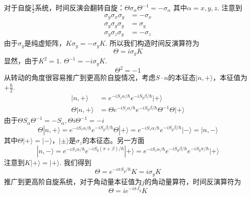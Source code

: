 \documentclass{article}
\numberwithin{equation}{subsection}
\begin{document}
对于自旋$\frac{1}{2}$系统，时间反演会翻转自旋：$\Theta\sigma_\alpha\Theta^{-1}=-\sigma_\alpha$
其中$\alpha=x,y,z$. 注意到
\begin{equation}
    \begin{split}
        \sigma_y\sigma_x\sigma_y&=-\sigma_x\\
        \sigma_y\sigma_y\sigma_y&=\sigma_y\\
        \sigma_y\sigma_z\sigma_y&=-\sigma_z
    \end{split}
\end{equation}
由于$\sigma_y$是纯虚矩阵，$K\sigma_y=-\sigma_yK$. 所以我们构造时间反演算符为
\begin{equation}
    \Theta=i\sigma_yK
\end{equation}
显然，由于$K^2=1$. $\Theta^{-1}=-i\sigma_yK$. 
\begin{equation}
    \Theta^2=-1
\end{equation}
从转动的角度很容易推广到更高阶自旋情况，考虑$S\cdot n$的本征态$|n,+\rangle$，本征值为$+\frac{\hbar}{2}$.
\begin{equation}
    \begin{aligned}
        |n,+\rangle &=e^{-i S_{z} \alpha / \hbar} e^{-i S_{y} \beta / \hbar}|+\rangle \\
        \Theta|n,+\rangle &=\Theta e^{-i S_{z} \alpha / \hbar} e^{-i S_{y} \beta / \hbar} \Theta^{-1} \Theta|+\rangle
        \end{aligned}
\end{equation}
由于$\Theta S_\alpha\Theta^{-1}=-S_\alpha,\Theta i\Theta^{-1}=-i$
\begin{equation}
    \Theta|n,+\rangle=e^{-i S_{z} \alpha / \hbar} e^{-i S_{y} \beta / \hbar} \Theta|+\rangle=e^{-i S_{z} \alpha / \hbar} e^{-i S_{y} \beta / \hbar}|-\rangle=|n,-\rangle
\end{equation}
其中$\Theta|+\rangle=|-\rangle$，$|\pm\rangle$是$\sigma_z$的本征态。另一方面
\begin{equation}
    |n,-\rangle=e^{-i S_{z} \alpha / \hbar} e^{-i S_{y}(\pi+\beta) / \hbar}|+\rangle=e^{-i S_{z} \alpha / \hbar} e^{-i S_{y} \beta / \hbar} e^{-i S_{y} \pi / \hbar}|+\rangle
\end{equation}
注意到$K|+\rangle=|+\rangle$. 我们得到
\begin{equation}
    \Theta=e^{-i\pi S_y/\hbar}K=i\sigma_yK
\end{equation}
推广到更高阶自旋系统，对于角动量本征值为$j$的角动量算符，时间反演算符为
\begin{equation}
    \Theta=ie^{-i\pi J_y}K
\end{equation}
\end{document}
